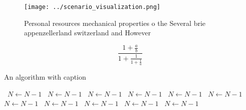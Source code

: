 \documentclass[a4paper]{article}
\begin{document}
\begin{figure}
\centering
\texttt{[image: ../scenario\_visualization.png]}
\caption{Personal resources mechanical properties o the Several brie appenzellerland switzerland and However
}
\end{figure}
 
\[ \frac{1+\frac{a}{b}}{1+\frac{1}{1+\frac{1}{a}}} \]

\begin{algorithm}
\caption{An algorithm with caption}
\begin{algorithmic}
\    \State $N \gets N - 1$
\    \State $N \gets N - 1$
\    \State $N \gets N - 1$
\    \State $N \gets N - 1$
\    \State $N \gets N - 1$
\    \State $N \gets N - 1$
\    \State $N \gets N - 1$
\    \State $N \gets N - 1$
\    \State $N \gets N - 1$
\    \State $N \gets N - 1$
\    \State $N \gets N - 1$
\EndWhile
\end{algorithmic}
\end{algorithm}
\end{document}
